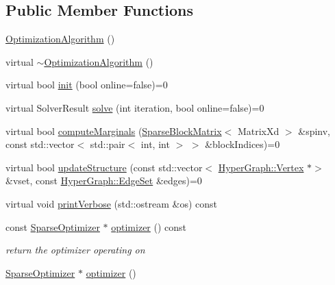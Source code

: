 \subsection*{Public Member Functions}
\begin{DoxyCompactItemize}
\item 
\mbox{\hyperlink{classg2o_1_1_optimization_algorithm_a205013e0425b7bbae01cd16caf500ebb}{Optimization\+Algorithm}} ()
\item 
virtual \mbox{\hyperlink{classg2o_1_1_optimization_algorithm_af2516e3d66596ec9c9dfdd08d48e90f9}{$\sim$\+Optimization\+Algorithm}} ()
\item 
virtual bool \mbox{\hyperlink{classg2o_1_1_optimization_algorithm_af5b54ea6d40a8ab4c16d448ba02a0c80}{init}} (bool online=false)=0
\item 
virtual Solver\+Result \mbox{\hyperlink{classg2o_1_1_optimization_algorithm_ab174deeeb2551ceaf715ea09f0f9c077}{solve}} (int iteration, bool online=false)=0
\item 
virtual bool \mbox{\hyperlink{classg2o_1_1_optimization_algorithm_a67b159f3a83471ba9ebcc0a9162a0e23}{compute\+Marginals}} (\mbox{\hyperlink{classg2o_1_1_sparse_block_matrix}{Sparse\+Block\+Matrix}}$<$ Matrix\+Xd $>$ \&spinv, const std\+::vector$<$ std\+::pair$<$ int, int $>$ $>$ \&block\+Indices)=0
\item 
virtual bool \mbox{\hyperlink{classg2o_1_1_optimization_algorithm_a350d9bb4ee701e40b75e67d26293a4bd}{update\+Structure}} (const std\+::vector$<$ \mbox{\hyperlink{classg2o_1_1_hyper_graph_1_1_vertex}{Hyper\+Graph\+::\+Vertex}} $\ast$$>$ \&vset, const \mbox{\hyperlink{classg2o_1_1_hyper_graph_a5e2970e236c0dcb4eff7c205d7b6b4ae}{Hyper\+Graph\+::\+Edge\+Set}} \&edges)=0
\item 
virtual void \mbox{\hyperlink{classg2o_1_1_optimization_algorithm_a6683d35e67402b50924bc4744b6e282a}{print\+Verbose}} (std\+::ostream \&os) const
\item 
const \mbox{\hyperlink{classg2o_1_1_sparse_optimizer}{Sparse\+Optimizer}} $\ast$ \mbox{\hyperlink{classg2o_1_1_optimization_algorithm_a040b3e3fd814d9928fa73ae6e98cedc5}{optimizer}} () const
\begin{DoxyCompactList}\small\item\em return the optimizer operating on \end{DoxyCompactList}\item 
\mbox{\hyperlink{classg2o_1_1_sparse_optimizer}{Sparse\+Optimizer}} $\ast$ \mbox{\hyperlink{classg2o_1_1_optimization_algorithm_ac6ca7a2adbd25615be78316bc811a315}{optimizer}} ()
$$
\end{DoxyCompactItemize}
